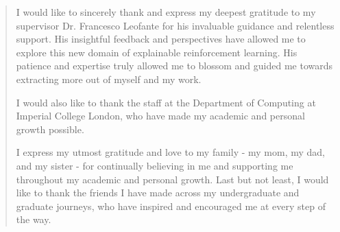 \documentclass[12pt,twoside]{report}
\begin{document}
\renewcommand{\abstractname}{Acknowledgements}
\begin{abstract}

I would like to sincerely thank and express my deepest gratitude to my supervisor Dr. Francesco Leofante for his invaluable guidance and relentless support. His insightful feedback and perspectives have allowed me to explore this new domain of explainable reinforcement learning. His patience and expertise truly allowed me to blossom and guided me towards extracting more out of myself and my work.

I would also like to thank the staff at the Department of Computing at Imperial College London, who have made my academic and personal growth possible.

I express my utmost gratitude and love to my family - my mom, my dad, and my sister - for continually believing in me and supporting me throughout my academic and personal growth. Last but not least, I would like to thank the friends I have made across my undergraduate and graduate journeys, who have inspired and encouraged me at every step of the way.

\end{abstract}

\clearpage{\pagestyle{empty}\cleardoublepage}

\tableofcontents 

\clearpage{\pagestyle{empty}\cleardoublepage}
\setcounter{page}{1}
\fancyhead[LE,RO]{\slshape \rightmark}
\fancyhead[LO,RE]{\slshape \leftmark}













\end{document}
